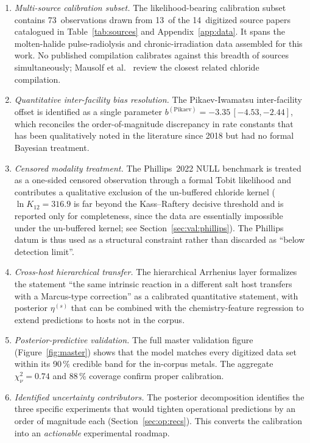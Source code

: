 \documentclass[11pt]{article}
\theoremstyle{plain}
\theoremstyle{definition}
\theoremstyle{remark}
\begin{document}
\begin{enumerate}
\item \emph{Multi-source calibration subset.}  The likelihood-bearing
      calibration subset contains 73~observations drawn from 13~of the
      14~digitized source papers catalogued in Table~\ref{tab:sources}
      and Appendix~\ref{app:data}.  It spans the molten-halide
      pulse-radiolysis and chronic-irradiation data assembled for this
      work.  No published compilation calibrates against this breadth of
      sources simultaneously; Mausolf et al.~\citep{Phillips2022} review
      the closest related chloride compilation.
\item \emph{Quantitative inter-facility bias resolution.}  The
      Pikaev-Iwamatsu inter-facility offset is identified as a single
      parameter $b^{(\mathrm{Pikaev})} = -3.35\,[-4.53, -2.44]$, which
      reconciles the order-of-magnitude discrepancy in rate constants that
      has been qualitatively noted in the literature since 2018
      \citep{KristoffersenMetiu2018,Iwamatsu2022} but had no formal Bayesian treatment.
\item \emph{Censored modality treatment.}  The Phillips~2022 NULL benchmark
      is treated as a one-sided censored observation through a formal Tobit
      likelihood and contributes a qualitative exclusion of the un-buffered
      chloride kernel ($\ln K_{12} = 316.9$ is far beyond the Kass--Raftery
      decisive threshold and is reported only for completeness, since the
      data are essentially impossible under the un-buffered kernel; see
      Section~\ref{sec:val:phillips}).  The Phillips datum is thus used as
      a structural constraint rather than discarded as ``below detection
      limit''.
\item \emph{Cross-host hierarchical transfer.}  The
      hierarchical Arrhenius layer formalizes the statement ``the same
      intrinsic reaction in a different salt host transfers with a
      Marcus-type correction'' as a calibrated quantitative statement,
      with posterior $\eta^{(s)}$ that can be combined with the
      chemistry-feature regression to extend predictions to hosts not in
      the corpus.
\item \emph{Posterior-predictive validation.}  The full master validation
      figure (Figure~\ref{fig:master}) shows that the model
      matches every digitized data set within its 90\,\% credible band for
      the in-corpus metals.  The aggregate $\chi^2_\nu = 0.74$ and 88\,\%
      coverage confirm proper calibration.
\item \emph{Identified uncertainty contributors.}  The posterior
      decomposition identifies the three specific experiments that would
      tighten operational predictions by an order of magnitude each
      (Section~\ref{sec:op:recs}).  This converts the calibration into an
      \emph{actionable} experimental roadmap.
\end{enumerate}
\end{document}
